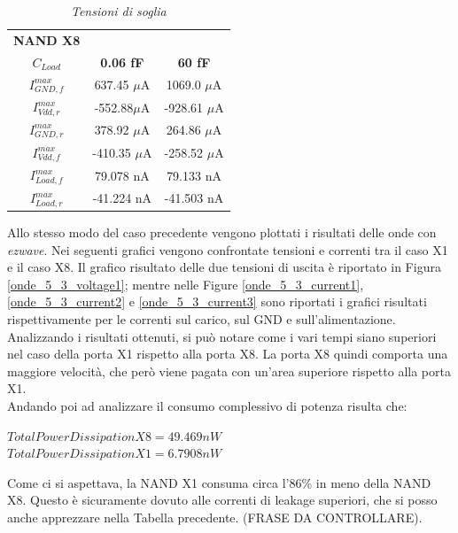 \begin{table}[!h]\footnotesize
	\centering
	\begin{tabular}{|c|c|c|}
		\hline
		\textbf{NAND X8} & &\\
		\textbf{$C_{Load}$} & \textbf{0.06 fF} & \textbf{60 fF}\\
		\hline
		$I_{GND, f}^{max}$ &637.45 $\mu$A &1069.0 $\mu$A\\
		
		$I_{Vdd, r}^{max}$ &-552.88$\mu$A &-928.61 $\mu$A \\
		
		$I_{GND, r}^{max}$&378.92 $\mu$A &264.86 $\mu$A\\
		
		$I_{Vdd, f}^{max}$&-410.35 $\mu$A&-258.52 $\mu$A \\
		
		$I_{Load, f}^{max}$ &79.078 nA &79.133 nA \\
		
		$I_{Load, r}^{max}$ &-41.224 nA &-41.503 nA  \\
		\hline
	\end{tabular}
	\caption{\textit{Tensioni di soglia}}
	\label{Tab5_10}
\end{table}
\newpage
\noindent Allo stesso modo del caso precedente vengono plottati i risultati delle onde con \textit{ezwave}. Nei seguenti grafici vengono confrontate tensioni e correnti tra il caso X1 e il caso X8. Il grafico risultato delle due tensioni di uscita è riportato in Figura \ref{onde_5_3_voltage1}; mentre nelle Figure \ref{onde_5_3_current1}, \ref{onde_5_3_current2} e \ref{onde_5_3_current3} sono riportati i grafici risultati rispettivamente per le correnti sul carico, sul GND e sull'alimentazione.\\
\noindent Analizzando i risultati ottenuti, si può notare come i vari tempi siano superiori nel caso della porta X1 rispetto alla porta X8. La porta X8 quindi comporta una maggiore velocità, che però viene pagata con un'area superiore rispetto alla porta X1.\\
Andando poi ad analizzare il consumo complessivo di potenza risulta che:
\begin{center}
	$Total Power Dissipation X8 = 49.469 nW $ \\
	$Total Power Dissipation X1 = 6.7908 nW $
\end{center}
Come ci si aspettava, la NAND X1 consuma circa l'86\% in meno della NAND X8. Questo è sicuramente dovuto alle correnti di leakage superiori, che si posso anche apprezzare nella Tabella precedente. (FRASE DA CONTROLLARE).\\
